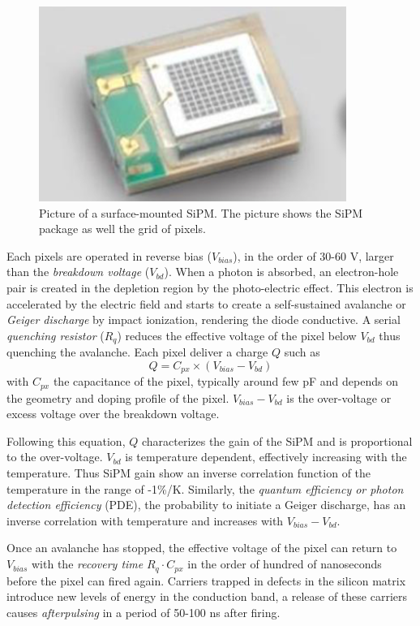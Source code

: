 \begin{figure}[htbp!]
  \centering
  \includegraphics[width=0.4\linewidth]{chap3/fig/SMD_SiPM.png}
  \caption{Picture of a surface-mounted SiPM. The picture shows the SiPM package as well the grid of pixels.} \label{fig:SMD_SiPM}
\end{figure}

Each pixels are operated in reverse bias ($V_{bias}$), in the order of 30-60 V, larger than the \textit{breakdown voltage} ($V_{bd}$). When a photon is absorbed, an electron-hole pair is created in the depletion region by the photo-electric effect. This electron is accelerated by the electric field and starts to create a self-sustained avalanche or \textit{Geiger discharge} by impact ionization, rendering the diode conductive. A serial \textit{quenching resistor} ($R_q$) reduces the effective voltage of the pixel below $V_{bd}$ thus quenching the avalanche. Each pixel deliver a charge $Q$ such as
\begin{equation}
  Q = C_{px} \times (V_{bias} - V_{bd})
\end{equation}
with $C_{px}$ the capacitance of the pixel, typically around few pF and depends on the geometry and doping profile of the pixel. $V_{bias} - V_{bd}$ is the over-voltage or excess voltage over the breakdown voltage.

Following this equation, $Q$ characterizes the gain of the SiPM and is proportional to the over-voltage. $V_{bd}$ is temperature dependent, effectively increasing with the temperature. Thus SiPM gain show an inverse correlation function of the temperature in the range of -1\%/K. Similarly, the \textit{quantum efficiency or photon detection efficiency} (PDE), the probability to initiate a Geiger discharge, has an inverse correlation with temperature and increases with $V_{bias} - V_{bd}$.

Once an avalanche has stopped, the effective voltage of the pixel can return to $V_{bias}$ with the \textit{recovery time} $R_q \cdot C_{px}$ in the order of hundred of nanoseconds before the pixel can fired again. Carriers trapped in defects in the silicon matrix introduce new levels of energy in the conduction band, a release of these carriers causes \textit{afterpulsing} in a period of 50-100 ns after firing.

